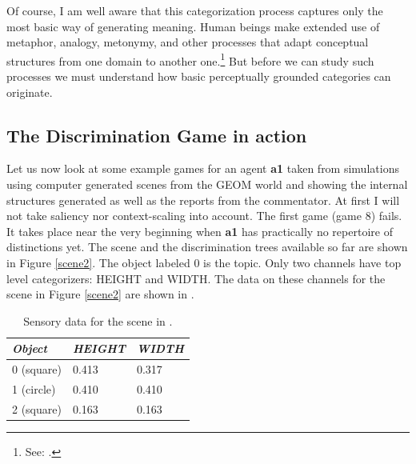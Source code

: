 Of course, I am well aware that this categorization 
process captures only the most basic way of generating
meaning. Human beings make extended use of metaphor, 
analogy, metonymy, and other processes that adapt 
conceptual structures from one domain to another one.\footnote{
See: \cite{Johnson:1987}.}
But before we can study such processes we must understand
how basic perceptually grounded categories can 
originate. 
 
\subsection{The Discrimination Game in action}

Let us now look at some example 
games for an agent {\bf a1} taken from simulations
using computer generated
scenes from the GEOM world and showing the internal
structures generated as well as the reports from the commentator. 
At first I will not take saliency nor 
context-scaling into account. The first game
(game 8) fails. It takes place near the very beginning 
when {\bf a1} has practically 
no repertoire of distinctions yet. The scene and the 
discrimination trees available so far are shown in Figure 
\ref{scene2}. The object labeled 0 is the
topic. Only two channels have top level
categorizers: HEIGHT and WIDTH. 
The data on these channels for the scene in Figure
\ref{scene2} are shown in . 
\begin{table}
\begin{center}
\begin{tabular}{ l  l  l } \hline
{\it Object} & {\it HEIGHT} & {\it WIDTH} \\ \hline
0 (square) & 0.413 & 0.317  \\ \hline
1 (circle) & 0.410 & 0.410 \\ \hline
2 (square) & 0.163 & 0.163 \\ \hline
\end{tabular}
\caption{\label{tab:t-game8} Sensory data for the scene in .}
\end{center}
\end{table}

